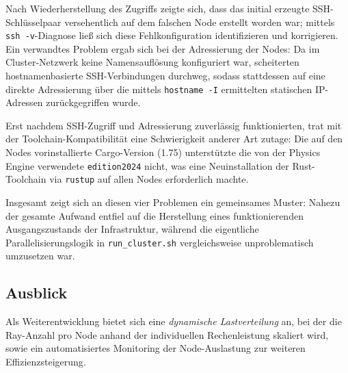 \documentclass{article}
\begin{document}
Nach Wiederherstellung des Zugriffs zeigte sich, dass das initial
erzeugte SSH-Schlüsselpaar versehentlich auf dem falschen Node erstellt
worden war; mittels \texttt{ssh -v}-Diagnose ließ sich diese
Fehlkonfiguration identifizieren und korrigieren. Ein verwandtes Problem
ergab sich bei der Adressierung der Nodes: Da im Cluster-Netzwerk keine
Namensauflösung konfiguriert war, scheiterten hostnamenbasierte
SSH-Verbindungen durchweg, sodass stattdessen auf eine direkte
Adressierung über die mittels \texttt{hostname -I} ermittelten statischen
IP-Adressen zurückgegriffen wurde.

Erst nachdem SSH-Zugriff und Adressierung zuverlässig funktionierten,
trat mit der Toolchain-Kompatibilität eine Schwierigkeit anderer Art
zutage: Die auf den Nodes vorinstallierte Cargo-Version (1.75)
unterstützte die von der Physics Engine verwendete \texttt{edition2024}
nicht, was eine Neuinstallation der Rust-Toolchain via \texttt{rustup}
auf allen Nodes erforderlich machte.

Insgesamt zeigt sich an diesen vier Problemen ein gemeinsames Muster:
Nahezu der gesamte Aufwand entfiel auf die Herstellung eines
funktionierenden Ausgangszustands der Infrastruktur, während die
eigentliche Parallelisierungslogik in \texttt{run\_cluster.sh} vergleichsweise
unproblematisch umzusetzen war.

\subsection{Ausblick}
\label{sec:ausblick}
Als Weiterentwicklung bietet sich eine \emph{dynamische Lastverteilung}
an, bei der die Ray-Anzahl pro Node anhand der individuellen
Rechenleistung skaliert wird, sowie ein automatisiertes Monitoring der
Node-Auslastung zur weiteren Effizienzsteigerung.
\end{document}
